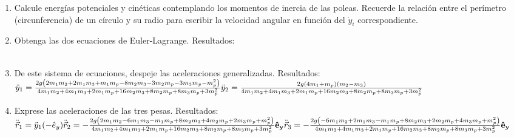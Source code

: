 \documentclass[11pt, spanish, a4paper, twoside]{article}
\begin{document}
\begin{enumerate}
		\begin{enumerate}
			\item Calcule energías potenciales y cinéticas contemplando los momentos de inercia de las poleas.
			Recuerde la relación entre el perímetro (circunferencia) de un círculo y su radio para escribir la velocidad angular en función del \(\dot{y}_i\) correspondiente.
			\item Obtenga las dos ecuaciones de Euler-Lagrange.
			Resultados:\\
			\\
			\item De este sistema de ecuaciones, despeje las aceleraciones generalizadas.
			Resultados:\\
			\(
				\ddot{y}_{1} = \frac{2 g \left(2 m_{1} m_{2} + 2 m_{1} m_{3} + m_{1} m_{p} - 8 m_{2} m_{3} - 3 m_{2} m_{p} - 3 m_{3} m_{p} - m_{p}^{2}\right)}{4 m_{1} m_{2} + 4 m_{1} m_{3} + 2 m_{1} m_{p} + 16 m_{2} m_{3} + 8 m_{2} m_{p} + 8 m_{3} m_{p} + 3 m_{p}^{2}}\\
				\ddot{y}_{2} = \frac{2 g \left(4 m_{1} + m_{p}\right) \left(m_{2} - m_{3}\right)}{4 m_{1} m_{2} + 4 m_{1} m_{3} + 2 m_{1} m_{p} + 16 m_{2} m_{3} + 8 m_{2} m_{p} + 8 m_{3} m_{p} + 3 m_{p}^{2}}
			\)
			\item Exprese las aceleraciones de las tres pesas. Resultados:\\
			\(
				\ddot{\vec{r}}_{1} = \ddot{y}_1 (- \hat{e}_y)\\
				\ddot{\vec{r}}_{2} = -  \frac{2 g \left(2 m_{1} m_{2} - 6 m_{1} m_{3} - m_{1} m_{p} + 8 m_{2} m_{3} + 4 m_{2} m_{p} + 2 m_{3} m_{p} + m_{p}^{2}\right)}{4 m_{1} m_{2} + 4 m_{1} m_{3} + 2 m_{1} m_{p} + 16 m_{2} m_{3} + 8 m_{2} m_{p} + 8 m_{3} m_{p} + 3 m_{p}^{2}}\mathbf{\hat{e}_y} \\
				\ddot{\vec{r}}_{3} = -  \frac{2 g \left(- 6 m_{1} m_{2} + 2 m_{1} m_{3} - m_{1} m_{p} + 8 m_{2} m_{3} + 2 m_{2} m_{p} + 4 m_{3} m_{p} + m_{p}^{2}\right)}{4 m_{1} m_{2} + 4 m_{1} m_{3} + 2 m_{1} m_{p} + 16 m_{2} m_{3} + 8 m_{2} m_{p} + 8 m_{3} m_{p} + 3 m_{p}^{2}}\mathbf{\hat{e}_y}
				\) 
		\end{enumerate}

\end{enumerate}
\end{document}
